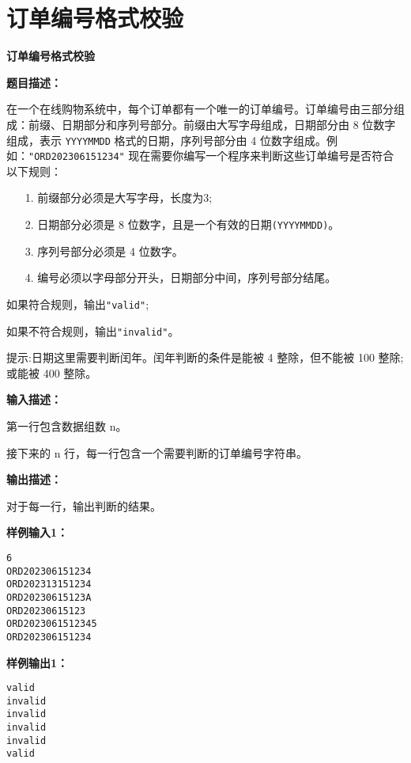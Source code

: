 \documentclass[a4paper]{ctexart}
\begin{document}
	
\section{订单编号格式校验}
	
\begin{center}
	\Large \textbf{订单编号格式校验}
\end{center}
	
\vspace{10pt}
	
\noindent\textbf{题目描述：}
	
在一个在线购物系统中，每个订单都有一个唯一的订单编号。订单编号由三部分组成：前缀、日期部分和序列号部分。前缀由大写字母组成，日期部分由 8 位数字组成，表示 \texttt{YYYYMMDD} 格式的日期，序列号部分由 4 位数字组成。例如：\texttt{"ORD202306151234"} 现在需要你编写一个程序来判断这些订单编号是否符合以下规则：
\begin{itemize}
	\item[1.] 前缀部分必须是大写字母，长度为3;
	\item[2.] 日期部分必须是 8 位数字，且是一个有效的日期\texttt{(YYYYMMDD)}。
	\item[3.] 序列号部分必须是 4 位数字。
	\item[4.] 编号必须以字母部分开头，日期部分中间，序列号部分结尾。
\end{itemize}
	
如果符合规则，输出\texttt{"valid"};
	
如果不符合规则，输出\texttt{"invalid"}。
	
提示:日期这里需要判断闰年。闰年判断的条件是能被 4 整除，但不能被 100 整除;或能被 400 整除。
	
\noindent\textbf{输入描述：}
	
第一行包含数据组数 n。
	
接下来的 n 行，每一行包含一个需要判断的订单编号字符串。
	
\noindent\textbf{输出描述：} 
	
对于每一行，输出判断的结果。
	
\noindent\textbf{样例输入1：}
	
\lstset{numbers=none}
\begin{lstlisting}
6
ORD202306151234
ORD202313151234
ORD20230615123A
ORD20230615123
ORD2023061512345
ORD202306151234
\end{lstlisting}
\lstset{numbers=left}
	
\noindent\textbf{样例输出1：}
\lstset{numbers=none}
\begin{lstlisting}
valid
invalid
invalid
invalid
invalid
valid
\end{lstlisting}
\lstset{numbers=left}
	
\end{document}
